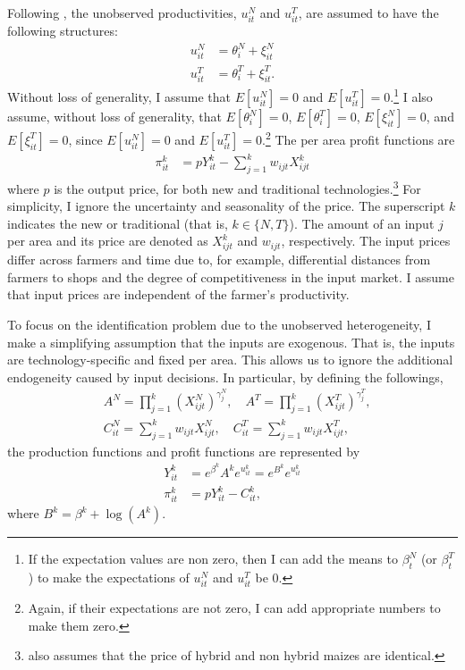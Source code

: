 \documentclass[11pt,letterpaper]{article}
\begin{document}
Following \citet{Suri11}, the unobserved productivities, $u_{it}^N$ and $u_{it}^T$, are assumed to have the following structures:
\begin{align*}
  u_{it}^N &= \theta_i^N + \xi_{it}^N \\
  u_{it}^T &= \theta_i^T + \xi_{it}^T.
\end{align*}
Without loss of generality, I assume that $E[u_{it}^N] = 0$ and $E[u_{it}^T] = 0$.\footnote{
  If the expectation values are non zero, then I can add the means to $\beta_t^N$ (or $\beta_t^T$) to make the expectations of $u_{it}^N$ and $u_{it}^T$ be 0.
}
I also assume, without loss of generality, that $E[\theta_i^N] = 0$, $E[\theta_i^T] = 0$, $E[\xi_{it}^N] = 0$, and $E[\xi_{it}^T] = 0$, since $E[u_{it}^N] = 0$ and $E[u_{it}^T] = 0$.\footnote{
  Again, if their expectations are not zero, I can add appropriate numbers to make them zero.
}
The per area profit functions are
\begin{align*}
  \pi_{it}^k &= p Y_{it}^k - \sum_{j=1}^k w_{ijt} X_{ijt}^k
\end{align*}
where $p$ is the output price, for both new and traditional technologies.\footnote{
  \citet{Suri11} also assumes that the price of hybrid and non hybrid maizes are identical.
}
For simplicity, I ignore the uncertainty and seasonality of the price.
The superscript $k$ indicates the new or traditional (that is, $k \in \{N, T\}$).
The amount of an input $j$ per area and its price are denoted as $X_{ijt}^k$ and $w_{ijt}$, respectively.
The input prices differ across farmers and time due to, for example, differential distances from farmers to shops and the degree of competitiveness in the input market.
I assume that input prices are independent of the farmer's productivity.

To focus on the identification problem due to the unobserved heterogeneity, I make a simplifying assumption that the inputs are exogenous.
That is, the inputs are technology-specific and fixed per area.
This allows us to ignore the additional endogeneity caused by input decisions.
In particular, by defining the followings,
\begin{align*}
  &A^N = \prod_{j = 1}^k \left( X_{ijt}^N \right)^{\gamma_j^N}, \quad A^T = \prod_{j = 1}^k \left( X_{ijt}^T \right)^{\gamma_j^T}, \\
  &C_{it}^N = \sum_{j = 1}^k w_{ijt} X_{ijt}^N, \quad C_{it}^T = \sum_{j = 1}^k w_{ijt} X_{ijt}^T,
\end{align*}
the production functions and profit functions are represented by
\begin{align*}
  Y_{it}^k &= e^{\beta^k} A^k e^{u_{it}^k} = e^{B^k} e^{u_{it}^k} \\
  \pi_{it}^k &= p Y_{it}^k - C_{it}^k,
\end{align*}
where $B^k = \beta^k + \log(A^k)$.
\end{document}
